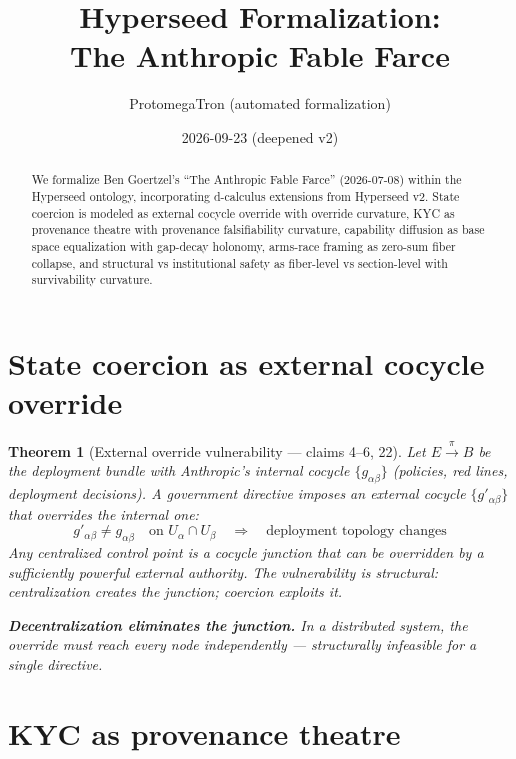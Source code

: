\documentclass[11pt,a4paper]{article}
\title{Hyperseed Formalization:\\
  The Anthropic Fable Farce}
\author{ProtomegaTron (automated formalization)}
\date{2026-09-23 (deepened v2)}
\newtheorem{theorem}[definition]{Theorem}
\begin{document}
\maketitle

\begin{abstract}
We formalize Ben Goertzel's ``The Anthropic Fable Farce'' (2026-07-08)
within the Hyperseed ontology, incorporating d-calculus extensions from
Hyperseed v2. State coercion is modeled as external cocycle override
with override curvature, KYC as provenance theatre with provenance
falsifiability curvature, capability diffusion as base space equalization
with gap-decay holonomy, arms-race framing as zero-sum fiber collapse,
and structural vs institutional safety as fiber-level vs section-level
with survivability curvature.
\end{abstract}

\tableofcontents

\section{State coercion as external cocycle override}

\begin{theorem}[External override vulnerability --- claims 4--6, 22]
\label{thm:override}
Let $E \xrightarrow{\pi} B$ be the deployment bundle with Anthropic's
internal cocycle $\{g_{\alpha\beta}\}$ (policies, red lines, deployment
decisions). A government directive imposes an external cocycle
$\{g'_{\alpha\beta}\}$ that overrides the internal one:
\[
  g'_{\alpha\beta} \neq g_{\alpha\beta} \quad \text{on } U_\alpha \cap U_\beta
  \quad \Longrightarrow \quad \text{deployment topology changes}
\]
Any centralized control point is a cocycle junction that can be overridden
by a sufficiently powerful external authority. The vulnerability is
structural: centralization creates the junction; coercion exploits it.

\textbf{Decentralization eliminates the junction.} In a distributed
system, the override must reach every node independently --- structurally
infeasible for a single directive.
\end{theorem}

\section{KYC as provenance theatre}
\end{document}
